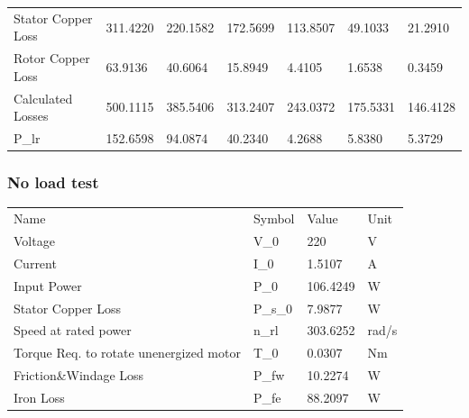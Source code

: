 \begin{table}[hbtp!]
\begin{tabular}{
    >{\columncolor[HTML]{9B9B9B}}l llllll}
    Stator Copper Loss                  & 311.4220                      & 220.1582                      & 172.5699                      & 113.8507                     & 49.1033                      & 21.2910                      \\
    Rotor Copper Loss                   & 63.9136                       & 40.6064                       & 15.8949                       & 4.4105                       & 1.6538                       & 0.3459                       \\
    Calculated Losses                   & 500.1115                      & 385.5406                      & 313.2407                      & 243.0372                     & 175.5331                     & 146.4128                     \\
    P\_lr                               & 152.6598                      & 94.0874                       & 40.2340                       & 4.2688                       & 5.8380                       & 5.3729                      
\end{tabular}
\end{table}

\subsubsection{No load test}
\begin{table}[hbtp!]
\begin{tabular}{llll}
    \rowcolor[HTML]{656565} 
    Name                                                              & Symbol  & Value    & Unit  \\
    \cellcolor[HTML]{656565}Voltage                                 & V\_0    & 220      & V       \\
    \rowcolor[HTML]{F2F2F2} 
    \cellcolor[HTML]{656565}Current                                 & I\_0    & 1.5107   & A       \\
    \cellcolor[HTML]{656565}Input Power                             & P\_0    & 106.4249 & W       \\
    \rowcolor[HTML]{F2F2F2} 
    \cellcolor[HTML]{656565}Stator Copper Loss                      & P\_s\_0 & 7.9877   & W       \\
    \cellcolor[HTML]{656565}Speed at rated power                    & n\_rl   & 303.6252 & rad/s   \\
    \rowcolor[HTML]{F2F2F2} 
    \cellcolor[HTML]{656565}Torque Req. to rotate unenergized motor & T\_0    & 0.0307   & Nm      \\
    \cellcolor[HTML]{656565}Friction\&Windage Loss                  & P\_fw   & 10.2274  & W       \\
    \rowcolor[HTML]{F2F2F2} 
    \cellcolor[HTML]{656565}Iron Loss                               & P\_fe   & 88.2097  & W      
\end{tabular}
\end{table}

